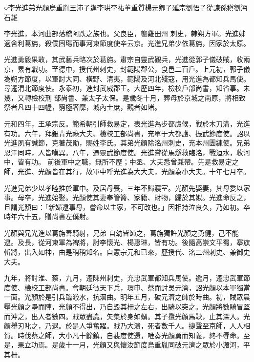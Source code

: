 
\begin{pinyinscope}

 ○李光進弟光顏烏重胤王沛子逢李珙李祐董重質楊元卿子延宗劉悟子從諫孫稹劉沔石雄



 李光進，本河曲部落稽阿跌之族也。父良臣，襲雞田州
 刺史，隸朔方軍。光進姊適舍利葛旃，殺僕固瑒而事河東節度使辛云京。光進兄弟少依葛旃，因家於太原。



 光進勇毅果敢，其武藝兵略次於葛旃。肅宗自靈武觀兵，光進從郭子儀破賊，收兩京，累有戰功。至德中，授代州刺史，封範陽郡公，食邑二百戶。上元初，郭子儀為朔方節度，以軍討大同、橫野、清夷，範陽及河北殘寇，用光進為都知兵馬使。尋遷渭北節度使。永泰初，進封武威郡王。大歷四年，檢校戶部尚書，知省事。未幾，又轉檢校刑
 部尚書、兼太子太保。是歲冬十月，葬母於京城之南原，將相致祭者凡四十四幄，窮極奢靡，城內士庶，觀者如堵。



 元和四年，王承宗反。範希朝引師救易定，表光進為步都虞候，戰於木刀溝，光進有功。六年，拜銀青光祿大夫、檢校工部尚書，充單于大都護、振武節度使。詔以光進夙有誠節，克著茂勛，賜姓李氏。其弟光顏除洺州刺史，充本州團練使。兄弟恩澤同時，人皆嘆異。八年，遷靈武節度使。光進嘗從馬燧救臨洺，戰洹水，收河中，皆有功。
 前後軍中之職，無所不歷；中丞、大夫悉曾兼帶。先是救易定之師，光進、光顏皆在其行，故軍中呼光進為大大夫，光顏為小大夫。十年七月卒。



 光進兄弟少以孝睦推於軍中。及居母喪，三年不歸寢室。光顏先娶妻，其母委以家事。母卒，光進始娶。光顏使其妻奉管籥、家籍、財物，歸於其姒。光進命反之，且謂光顏曰：「新婦逮事母，嘗命以主家，不可改也。」因相持泣良久，乃如初。卒時年六十五，贈尚書左僕射。



 光顏與兄光進以葛旃善騎射，兄弟
 自幼皆師之，葛旃獨許光顏之勇健，己不能逮。及長，從河東軍為裨將，討李懷光、楊惠琳，皆有功。後隨高崇文平蜀，搴旗斬將，出入如神，由是稍稍知名。自憲宗元和已來，歷授代、洺二州刺史、兼御史大夫。



 九年，將討淮、蔡，九月，遷陳州刺史，充忠武軍都知兵馬使。逾月，遷忠武軍節度使、檢校工部尚書。會朝廷徵天下兵，環申、蔡而討吳元濟，詔光顏以本軍獨當一面。光顏於是引兵臨溵水，抗洄曲。明年五月，破元濟之師於時曲。初，賊眾晨
 壓光顏之壘而陣，光顏不得出，乃自毀其柵之左右，出騎以突之。光顏將數騎冒堅而沖之，出入者數四。賊眾盡識，矢集於身如蝟。其子攬光顏馬鞅，止其深入。光顏舉刃叱之，乃退。於是人爭奮躍。賊乃大潰，死者數千人。捷聲至京師，人人相賀。時伐蔡之師，大小凡十餘鎮，自裴度使還，唯奏光顏勇而知義，終不辱命。至是，果立功焉。是歲十一月，光顏又與懷汝節度烏重胤同破元濟之眾於小溵河，平其柵。




\end{pinyinscope}
